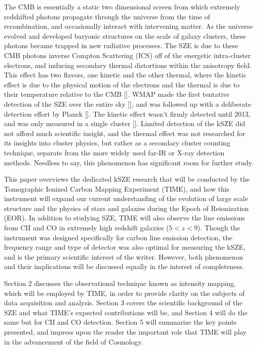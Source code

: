 \documentclass[manuscript]{aastex}
\begin{document}
 The CMB is essentially a static two dimensional screen from which extremely redshifted photons propagate through the universe from the time of recombination, and occasionally interact with intervening matter. As the universe evolved and developed baryonic structures on the scale of galaxy clusters, these photons became trapped in new radiative processes. The SZE is due to these CMB photons inverse Compton Scattering (ICS) off of the energetic intra-cluster electrons, and inducing secondary thermal distortions within the anisotropy field. This effect has two flavors, one kinetic and the other thermal, where the kinetic effect is due to the physical motion of the electrons and the thermal is due to their temperature relative to the CMB [\cite{Sunyaev1970}]. WMAP made the first tentative detection of the SZE over the entire sky [\cite{Bond2003}], and was followed up with a deliberate detection effort by Planck [\cite{Planck2013}]. The kinetic effect wasn't firmly detected until 2013, and was only measured in a single cluster [\cite{Sayers2013}]. Limited detection of the kSZE did not afford much scientific insight, and the thermal effect was not researched for its insights into cluster physics, but rather as a secondary cluster counting technique, separate from the more widely used far-IR or X-ray detection methods. Needless to say, this phenomenon has significant room for further study.
 
This paper overviews the dedicated kSZE research that will be conducted by the Tomographic Ionized Carbon Mapping Experiment (TIME), and how this instrument will expand our current understanding of the evolution of large scale structure and the physics of stars and galaxies during the Epoch of Reionization (EOR). In addition to studying SZE, TIME will also observe the line emissions from CII and CO in extremely high redshift galaxies ($5 < z < 9$). Though the instrument was designed specifically for carbon line emission detection, the frequency range and type of detector was also optimal for measuring the kSZE, and is the primary scientific interest of the writer. However, both phenomenon and their implications will be discussed equally in the interest of completeness. 
 
Section 2 discusses the observational technique known as intensity mapping, which will be employed by TIME, in order to provide clarity on the subjects of data acquisition and analysis. Section 3 covers the scientific background of the SZE and what TIME's expected contributions will be, and Section 4 will do the same but for CII and CO detection. Section 5 will summarize the key points presented, and impress upon the reader the important role that TIME will play in the advancement of the field of Cosmology. 
\end{document}
